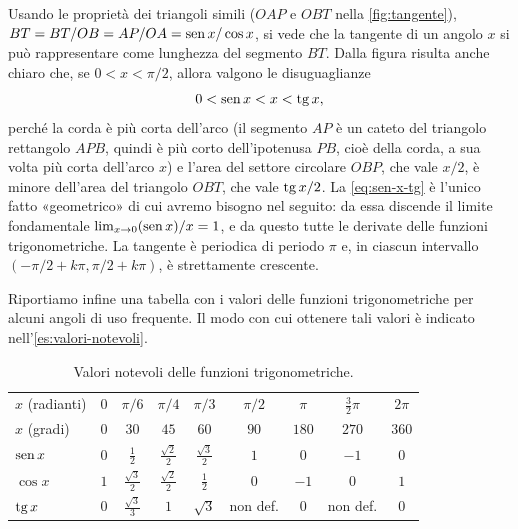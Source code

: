 Usando le proprietà dei triangoli simili ($OAP$ e $OBT$ nella \cref{fig:tangente}),
$BT=BT/OB=AP/OA=\operatorname{sen} x/\cos x$, si vede che la tangente di un angolo $x$ si può
rappresentare come lunghezza del segmento $BT$. Dalla figura risulta anche chiaro che,
se $0<x<\pi/2$, allora valgono le disuguaglianze
\begin{equation}\label{eq:sen-x-tg}
  0<\operatorname{sen} x<x<\operatorname{tg} x,
\end{equation}
perché la corda è più corta dell'arco (il segmento $AP$ è un cateto del triangolo
rettangolo $APB$, quindi è più corto dell'ipotenusa $PB$, cioè della corda, a sua volta
più corta dell'arco $x$) e l'area del settore circolare $OBP$, che vale $x/2$, è
minore dell'area del triangolo $OBT$, che vale $\operatorname{tg} x/2$. La \eqref{eq:sen-x-tg} è
l'unico fatto «geometrico» di cui avremo bisogno nel seguito: da essa discende il
limite fondamentale $\lim_{x\to0}(\operatorname{sen} x)/x=1$, e da questo tutte le derivate delle
funzioni trigonometriche. La tangente è periodica di periodo $\pi$ e, in ciascun
intervallo $(-\pi/2+k\pi,\pi/2+k\pi)$, è strettamente crescente.

Riportiamo infine una tabella con i valori delle funzioni trigonometriche per alcuni
angoli di uso frequente. Il modo con cui ottenere tali valori è indicato
nell'\cref{es:valori-notevoli}.

\begin{table}[htb]
\centering
\renewcommand{\arraystretch}{1.35}
\setlength{\tabcolsep}{5pt}
\begin{tabular}{l*{8}{c}}
\toprule
$x$ (radianti) & $0$ & $\pi/6$ & $\pi/4$ & $\pi/3$ & $\pi/2$ & $\pi$ & $\tfrac32\pi$ & $2\pi$ \\
$x$ (gradi) & $0$ & $30$ & $45$ & $60$ & $90$ & $180$ & $270$ & $360$ \\
\midrule
$\operatorname{sen} x$ & $0$ & $\tfrac12$ & $\tfrac{\sqrt2}{2}$ & $\tfrac{\sqrt3}{2}$ & $1$ & $0$ & $-1$ & $0$ \\
$\cos x$ & $1$ & $\tfrac{\sqrt3}{2}$ & $\tfrac{\sqrt2}{2}$ & $\tfrac12$ & $0$ & $-1$ & $0$ & $1$ \\
$\operatorname{tg} x$ & $0$ & $\tfrac{\sqrt3}{3}$ & $1$ & $\sqrt3$ & non def. & $0$ & non def. & $0$ \\
\bottomrule
\end{tabular}
\caption{Valori notevoli delle funzioni trigonometriche.}
\label{tab:valori-notevoli}
\end{table}

